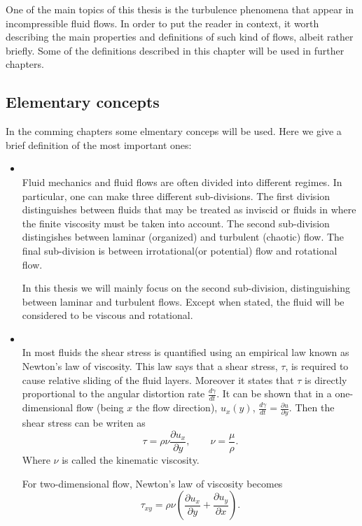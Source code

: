One of the main topics of this thesis is the turbulence phenomena that appear in incompressible fluid flows. In order to put the reader in context, it worth describing the main properties and definitions of such kind of flows, albeit rather briefly. Some of the definitions described in this chapter will be used in further chapters.

\subsection{Elementary concepts}
In the comming chapters some elmentary conceps will be used. Here we give a brief definition of the most important ones:
\begin{itemize}
\item{}\\Fluid mechanics and fluid flows are often divided into different regimes. In particular, one can make three different sub-divisions. The first division distinguishes between fluids that may be treated as inviscid or fluids in where the finite viscosity must be taken into account. The second sub-division distingishes between laminar (organized) and turbulent (chaotic) flow. The final sub-division is between irrotational(or potential) flow and rotational flow.

In this thesis we will mainly focus on the second sub-division, distinguishing between laminar and turbulent flows. Except when stated, the fluid will be considered to be viscous and rotational.

\item{}\\In most fluids the shear stress is quantified using an empirical law known as Newton's law of viscosity. This law says that a shear stress, $\tau$, is required to cause relative sliding of the fluid layers. Moreover it states that $\tau$ is directly proportional to the angular distortion rate $\frac{d\gamma}{dt}$. It can be shown that in a one-dimensional flow (being $x$ the flow direction), $ u_x(y) $, $ \frac{d\gamma}{dt}=\frac{\partial u}{\partial y} $. Then the shear stress can be writen as
$$\tau=\rho\nu\frac{\partial u_x}{\partial y},\quad\quad\nu=\frac{\mu}{\rho}.$$
Where $ \nu $ is called the kinematic viscosity.

For two-dimensional flow, Newton's law of viscosity becomes
$$ \tau_{xy}=\rho\nu\left(\frac{\partial u_x}{\partial y}+\frac{\partial u_y}{\partial x}\right). $$


\end{itemize}
